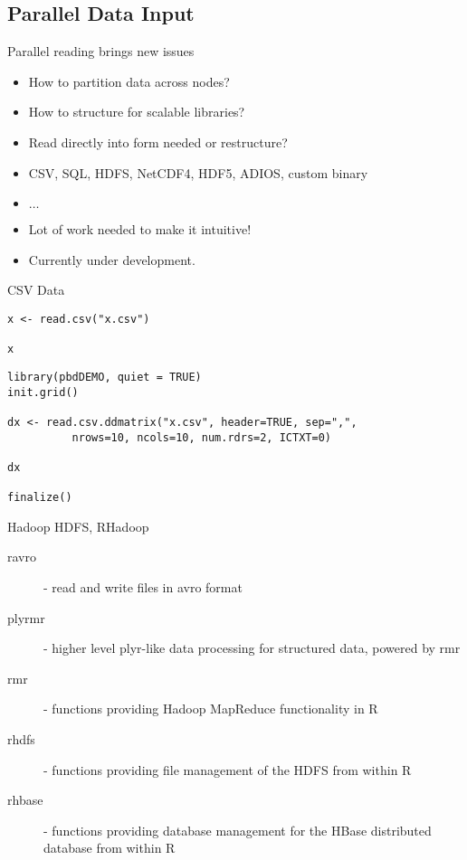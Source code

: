 \subsection{Parallel Data Input}
\makesubcontentsslidessec


\begin{frame}
  \begin{block}{Parallel reading brings new issues}\pause
    \begin{itemize}
    \item How to partition data across nodes?
    \item How to structure for scalable libraries?
    \item Read directly into form needed or restructure?
    \item CSV, SQL, HDFS, NetCDF4, HDF5, ADIOS, custom binary
    \item $\ldots$
    \item Lot of work needed to make it intuitive!
    \item Currently under development.
    \end{itemize}
  \end{block}
\end{frame}



\begin{frame}[fragile]
  \begin{exampleblock}{CSV Data}\pause
\begin{lstlisting}[title=Serial Code]
x <- read.csv("x.csv")

x
\end{lstlisting}

\begin{lstlisting}[title=Parallel Code]
library(pbdDEMO, quiet = TRUE)
init.grid()

dx <- read.csv.ddmatrix("x.csv", header=TRUE, sep=",", 
          nrows=10, ncols=10, num.rdrs=2, ICTXT=0)

dx

finalize()
\end{lstlisting}
  \end{exampleblock}
\end{frame}

\begin{frame}
  \begin{block}{Hadoop HDFS, RHadoop}\pause
    \begin{description}
      \item[ravro] - read and write files in avro format
      \item[plyrmr] - higher level plyr-like data processing for
        structured data, powered by rmr 
    \item[rmr] - functions providing Hadoop MapReduce functionality in
      R 
    \item[rhdfs] - functions providing file management of the HDFS
      from within R 
    \item[rhbase] - functions providing database management for the
      HBase distributed database from within R 
    \end{description}
  \end{block}
\end{frame}

